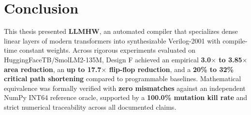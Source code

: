 \documentclass[11pt,a4paper]{article}
\begin{document}
\section{Conclusion}

This thesis presented \textbf{LLMHW}, an automated compiler that specializes dense linear layers of modern transformers into synthesizable Verilog-2001 with compile-time constant weights. Across rigorous experiments evaluated on HuggingFaceTB/SmolLM2-135M, Design F achieved an empirical \textbf{3.0$\times$ to 3.85$\times$ area reduction}, an \textbf{up to 17.7$\times$ flip-flop reduction}, and a \textbf{20\% to 32\% critical path shortening} compared to programmable baselines. Mathematical equivalence was formally verified with \textbf{zero mismatches} against an independent NumPy INT64 reference oracle, supported by a \textbf{100.0\% mutation kill rate} and strict numerical traceability across all documented claims.
\end{document}
